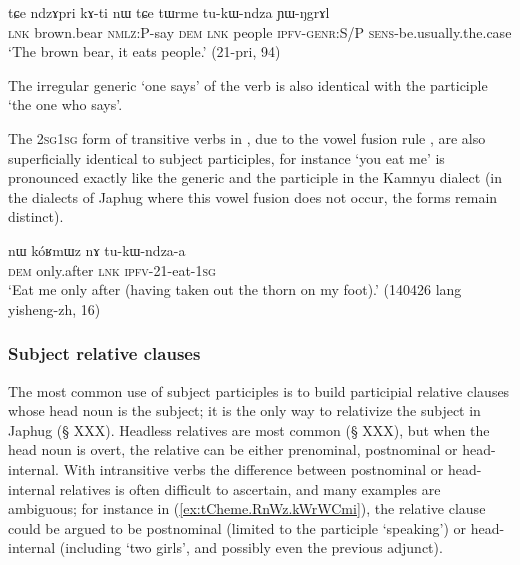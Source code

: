 \begin{exe}
\ex \label{ex:tukWndza.genr}
 \gll tɕe ndzɤpri kɤ-ti nɯ tɕe tɯrme tu-kɯ-ndza ɲɯ-ŋgrɤl  \\
 \textsc{lnk} brown.bear \textsc{nmlz}:P-say \textsc{dem} \textsc{lnk} people \textsc{ipfv}-\textsc{genr}:S/P \textsc{sens}-be.usually.the.case \\
\glt `The brown bear, it eats people.' (21-pri, 94)
\end{exe}
 
The irregular generic  `one says' of the verb  is also identical with the participle `the one who says'.

The \textsc{2sg}\fl{}\textsc{1sg} form of transitive verbs in , due to the vowel fusion rule  \fl{} , are also superficially identical to subject participles, for instance  `you eat me' is pronounced  exactly like the generic and the participle  in the Kamnyu dialect (in the dialects of Japhug where this vowel fusion does not occur, the forms remain distinct).

\begin{exe}
\ex \label{ex:tukWndzaa}
 \gll nɯ kóʁmɯz nɤ tu-kɯ-ndza-a \\
 \textsc{dem} only.after \textsc{lnk} \textsc{ipfv}-2\fl{}1-eat-\textsc{1sg} \\
 \glt `Eat me only after (having taken out the thorn on my foot).' (140426 lang yisheng-zh, 16)
\end{exe}



\subsubsection{Subject relative clauses}  \label{ex:subject.participle.subject.relative}
The most common use of subject participles is to build participial relative clauses whose head noun is the subject; it is the only way to relativize the subject in Japhug (§ XXX). Headless relatives are most common (§ XXX), but when the head noun is overt, the relative can be either prenominal, postnominal or head-internal. With intransitive verbs the difference between postnominal or head-internal relatives is often difficult to ascertain, and many examples are ambiguous; for instance in (\ref{ex:tCheme.RnWz.kWrWCmi}), the relative clause could be argued to be postnominal (limited to the participle  `speaking') or head-internal (including  `two girls', and possibly even the previous adjunct).

